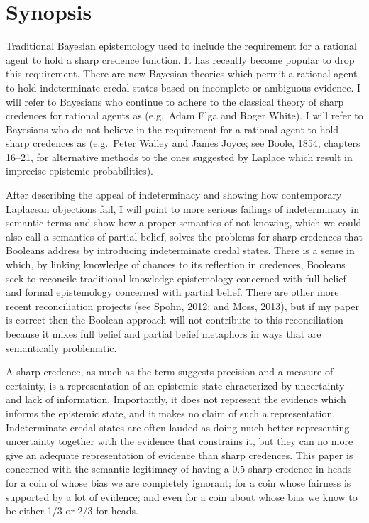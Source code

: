 \section{Synopsis}
\label{Synopsis}

Traditional Bayesian epistemology used to include the
requirement for a rational agent to hold a sharp
credence function. It has recently become popular to
drop this requirement. There are now Bayesian theories
which permit a rational agent to hold indeterminate
credal states based on incomplete or ambiguous
evidence. I will refer to Bayesians who continue to
adhere to the classical theory of sharp credences for
rational agents as  (e.g.\ Adam Elga
and Roger White). I will refer to Bayesians who do not
believe in the requirement for a rational agent to hold
sharp credences as  (e.g.\ Peter Walley
and James Joyce; see Boole, 1854, chapters 16--21, for
alternative methods to the ones suggested by Laplace
which result in imprecise epistemic probabilities).

After describing the appeal of indeterminacy and
showing how contemporary Laplacean objections fail, I
will point to more serious failings of indeterminacy in
semantic terms and show how a proper semantics of not
knowing, which we could also call a semantics of
partial belief, solves the problems for sharp credences
that Booleans address by introducing indeterminate
credal states. There is a sense in which, by linking
knowledge of chances to its reflection in credences,
Booleans seek to reconcile traditional knowledge
epistemology concerned with full belief and formal
epistemology concerned with partial belief. There are
other more recent reconciliation projects (see Spohn,
2012; and Moss, 2013), but if my paper is correct then
the Boolean approach will not contribute to this
reconciliation because it mixes full belief and partial
belief metaphors in ways that are semantically
problematic.

A sharp credence, as much as the term suggests
precision and a measure of certainty, is a
representation of an epistemic state chracterized by
uncertainty and lack of information. Importantly, it
does not represent the evidence which informs the
epistemic state, and it makes no claim of such a
representation. Indeterminate credal states are often
lauded as doing much better representing uncertainty
together with the evidence that constrains it, but they
can no more give an adequate representation of evidence
than sharp credences. This paper is concerned with the
semantic legitimacy of having a $0.5$ sharp credence in
heads for a coin of whose bias we are completely
ignorant; for a coin whose fairness is supported by a
lot of evidence; and even for a coin about whose bias
we know to be either 1/3 or 2/3 for heads.

